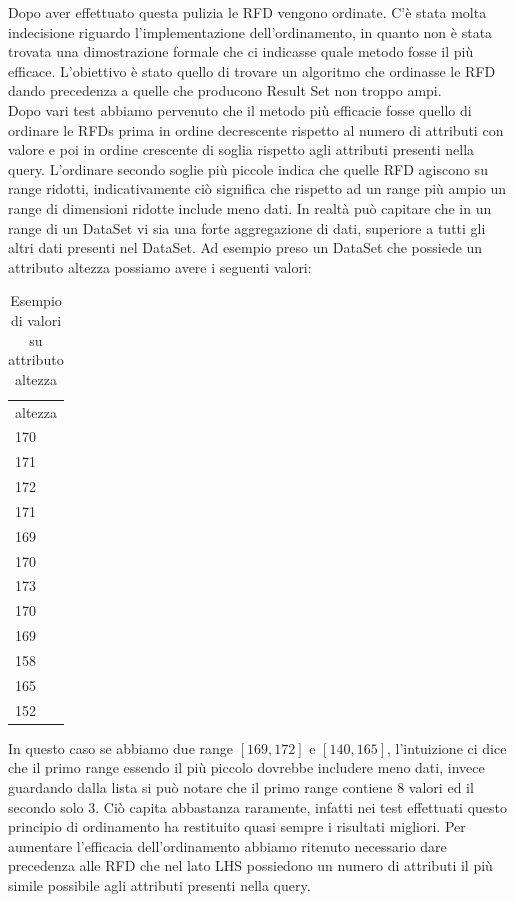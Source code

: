 Dopo aver effettuato questa pulizia le RFD vengono ordinate. 
\newline
C'è stata molta indecisione riguardo l'implementazione dell'ordinamento, in quanto non è stata trovata una dimostrazione formale che ci indicasse quale metodo fosse il più efficace.
L'obiettivo è stato quello di trovare un algoritmo che ordinasse le RFD dando precedenza a quelle che producono Result Set non troppo ampi.
\\
Dopo vari test abbiamo pervenuto che il metodo più efficacie fosse quello di ordinare le RFDs prima in ordine decrescente rispetto al numero di attributi con valore  e poi in ordine crescente di soglia rispetto agli attributi presenti nella query. 
L'ordinare secondo soglie più piccole indica che quelle RFD agiscono su range ridotti, indicativamente ciò significa che rispetto ad un range più ampio un range di dimensioni ridotte include meno dati. In realtà può capitare che in un range di un DataSet vi sia una forte aggregazione di dati, superiore a tutti gli altri dati presenti nel DataSet. Ad esempio preso un DataSet che possiede un attributo altezza possiamo avere i seguenti valori:
\begin{table}[H]
    \centering
    \begin{tabular}{l }
    altezza \\
    170 \\
    171 \\
    172 \\
    171 \\
    169 \\
    170 \\
    173 \\
    170 \\
    169 \\
    158 \\
    165 \\
    152 \\
    \end{tabular}
    \caption{Esempio di valori su attributo altezza}
    \label{tab:height_list}
\end{table}
In questo caso se abbiamo due range $[169,172]$ e $[140,165]$, l'intuizione ci dice che il primo range essendo il più piccolo dovrebbe includere meno dati, invece guardando dalla lista si può notare che il primo range contiene 8 valori ed il secondo solo 3.
Ciò capita abbastanza raramente, infatti nei test effettuati questo principio di ordinamento ha restituito quasi sempre i risultati migliori.
Per aumentare l'efficacia dell'ordinamento abbiamo ritenuto necessario dare precedenza alle RFD che nel lato LHS possiedono un numero di attributi il più simile possibile agli attributi presenti nella query.
